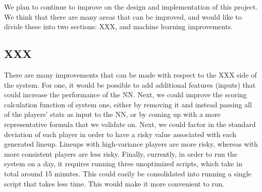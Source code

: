 
We plan to continue to improve on the design and implementation of this project. We think that there are many areas that can be improved, and would like to divide these into two sections: XXX, and machine learning improvements.

\subsection{XXX}
There are many improvements that can be made with respect to the XXX side of the system. For one, it would be possible to add additional features (inputs) that could increase the performance of the NN. Next, we could improve the scoring calculation function of system one, either by removing it and instead passing all of the players' stats as input to the NN, or by coming up with a more representative formula that we validate on. Next, we could factor in the standard deviation of each player in order to have a risky value associated with each generated lineup. Lineups with high-variance players are more risky, whereas with more consistent players are less risky. Finally, currently, in order to run the system on a day, it requires running three unoptimized scripts, which take in total around 15 minutes. This could easily be consolidated into running a single script that takes less time. This would make it more convenient to run. 

